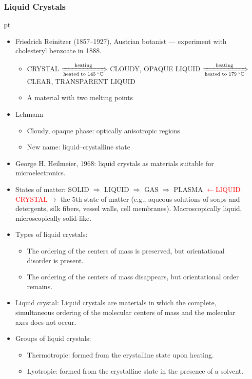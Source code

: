 \documentclass[t,aspectratio=169,xcolor=dvipsnames]{beamer}
\begin{document}
\begin{frame}
\frametitle{Liquid Crystals}
 pt  
\begin{itemize}
\setlength{\parskip}{0pt}
\setlength{\itemsep}{0pt}
\item Friedrich Reinitzer (1857–1927), Austrian botanist — experiment with cholesteryl benzoate in 1888.
\begin{itemize}
\setlength{\parskip}{0pt}
\setlength{\itemsep}{0pt}
\item CRYSTAL $\xRightarrow[\text{heated to }145\,^{\circ}\text{C}]{\text{heating}}$ CLOUDY, OPAQUE LIQUID $\xRightarrow[\text{heated to }179\,^{\circ}\text{C}]{\text{heating}}$ CLEAR, TRANSPARENT LIQUID
\item A material with two melting points
\end{itemize}
\item Lehmann
\begin{itemize}
\setlength{\parskip}{0pt}
\setlength{\itemsep}{0pt}
\item Cloudy, opaque phase: optically anisotropic regions
\item New name: liquid–crystalline state
\end{itemize}
\item George H. Heilmeier, 1968: liquid crystals as materials suitable for microelectronics.
\item States of matter: SOLID $\Rightarrow$ LIQUID $\Rightarrow$ GAS $\Rightarrow$ PLASMA \textcolor{red}{$\leftarrow$LIQUID CRYSTAL}$\rightarrow$ the 5th state of matter (e.g., aqueous solutions of soaps and detergents, silk fibers, vessel walls, cell membranes). Macroscopically liquid, microscopically solid-like.

\pagebreak

\item Types of liquid crystals:
\begin{itemize}
\item The ordering of the centers of mass is preserved, but orientational disorder is present.
\item The ordering of the centers of mass disappears, but orientational order remains.
\end{itemize}

\item \underline{Liquid crystal:} Liquid crystals are materials in which the complete, simultaneous ordering of the molecular centers of mass and the molecular axes does not occur.

\item Groups of liquid crystals:
\begin{itemize}
\item Thermotropic: formed from the crystalline state upon heating.
\item Lyotropic: formed from the crystalline state in the presence of a solvent.
\end{itemize}


\end{itemize}
\end{frame}
\end{document}
